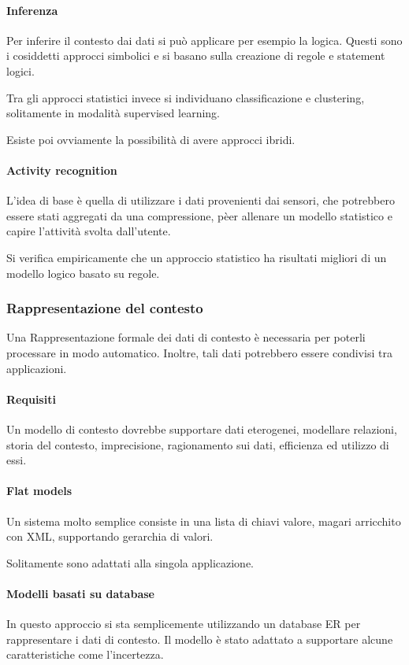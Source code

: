 \paragraph{Inferenza}
Per inferire il contesto dai dati si può applicare per esempio la logica. Questi 
sono i cosiddetti approcci simbolici e si basano sulla creazione di regole 
e statement logici.

Tra gli approcci statistici invece si individuano classificazione e clustering, 
solitamente in modalità supervised learning.

Esiste poi ovviamente la possibilità di avere approcci ibridi.

\paragraph{Activity recognition}
L'idea di base è quella di utilizzare i dati provenienti
dai sensori, che potrebbero essere stati aggregati 
da una compressione, pèer allenare un modello statistico 
e capire l'attività svolta dall'utente.

Si verifica empiricamente che un approccio statistico 
ha risultati migliori di un modello logico basato su regole.

\subsubsection{Rappresentazione del contesto}

Una Rappresentazione formale dei dati di contesto 
è necessaria per poterli processare in modo automatico. 
Inoltre, tali dati potrebbero essere condivisi tra applicazioni. 

\paragraph{Requisiti}
Un modello di contesto dovrebbe supportare dati eterogenei, 
modellare relazioni, storia del contesto, imprecisione, 
ragionamento sui dati, efficienza ed utilizzo di essi.

\paragraph{Flat models}
Un sistema molto semplice consiste in una lista di chiavi valore, 
magari arricchito con XML, supportando gerarchia di valori.

Solitamente sono adattati alla singola applicazione.

\paragraph{Modelli basati su database}
In questo approccio si sta semplicemente utilizzando un database
ER per rappresentare i dati di contesto. Il modello è stato 
adattato a supportare alcune caratteristiche come l'incertezza.

